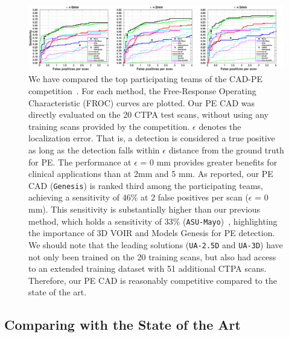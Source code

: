 
\begin{figure}
\begin{center}
\includegraphics[width=1.0\columnwidth]{Figures/CH6/fig_pe_cad.pdf}
\end{center}
\caption[Comparison of Our PE CAD System with the State of the Arts]{
We have compared the top participating teams of the CAD-PE competition~\citep{gonzalez2020computer}. For each method, the Free‐Response Operating Characteristic (FROC) curves are plotted. 
Our PE CAD was directly evaluated on the 20 CTPA test scans, without using any training scans provided by the competition. 
$\epsilon$ denotes the localization error. That is, a detection is considered a true positive as long as the detection falls within $\epsilon$ distance from the ground truth for PE. The performance at $\epsilon$ = 0 mm provides greater benefits for clinical applications than at 2mm and 5 mm. As reported, our PE CAD (\texttt{Genesis}) is ranked third among the participating teams, achieving a sensitivity of 46\% at 2 false positives per scan ($\epsilon$ = 0 mm). 
This sensitivity is substantially higher than our previous method, which holds a sensitivity of 33\%  (\texttt{ASU-Mayo})~\citep{tajbakhsh2019computer}, highlighting the importance of 3D VOIR and Models Genesis for PE detection. 
We should note that the leading solutions (\texttt{UA-2.5D} and \texttt{UA-3D}) have not only been trained on the 20 training scans, but also had access to an extended training dataset with 51 additional CTPA scans. 
Therefore, our PE CAD is reasonably competitive compared to the state of the art. 
}
\label{ch6:fig:pe_cad}
\end{figure}



\subsection{Comparing with the State of the Art}

